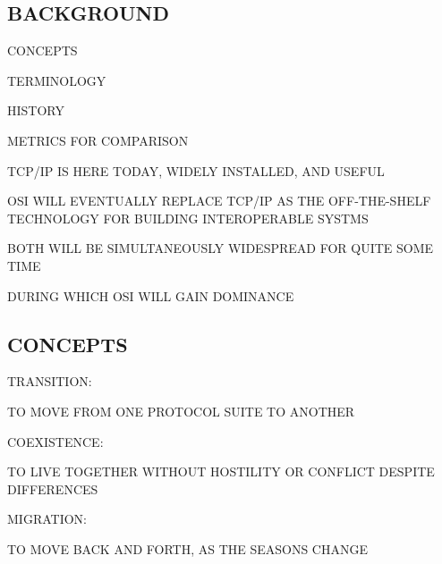\begin{bwslide}
\part	{BACKGROUND}\bf

\begin{nrtc}
\item	CONCEPTS

\item	TERMINOLOGY

\item	HISTORY

\item	METRICS FOR COMPARISON
\end{nrtc}
\end{bwslide}


\begin{bwslide}

\begin{nrtc}
\item	TCP/IP IS HERE TODAY, WIDELY INSTALLED, AND USEFUL

\item	OSI WILL EVENTUALLY REPLACE TCP/IP AS THE OFF-THE-SHELF TECHNOLOGY FOR
	BUILDING INTEROPERABLE SYSTMS

\item	BOTH WILL BE SIMULTANEOUSLY WIDESPREAD FOR QUITE SOME TIME
    \begin{nrtc}
    \item	DURING WHICH OSI WILL GAIN DOMINANCE
    \end{nrtc}
\end{nrtc}
\end{bwslide}


\begin{bwslide}
\part*	{CONCEPTS}\bf

\begin{nrtc}
\item	TRANSITION:
    \begin{nrtc}
    \item	TO MOVE FROM ONE PROTOCOL SUITE TO ANOTHER
    \end{nrtc}

\item	COEXISTENCE:
    \begin{nrtc}
    \item	TO LIVE TOGETHER WITHOUT HOSTILITY OR CONFLICT DESPITE
		DIFFERENCES
    \end{nrtc}

\item	MIGRATION:
    \begin{nrtc}
    \item	TO MOVE BACK AND FORTH, AS THE SEASONS CHANGE
    \end{nrtc}
\end{nrtc}
\end{bwslide}


